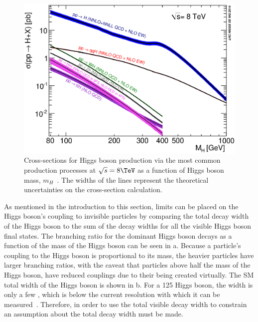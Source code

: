 \begin{figure}
  \includegraphics[width=\largefigwidth]{plots/theory/XS_8TeV.eps}
  \caption{Cross-sections for Higgs boson production via the most common production processes at $\sqrt{s}=8 \TeV$ as a function of Higgs boson mass, $m_{H}$~\cite{Heinemeyer:1559921}. The widths of the lines represent the theoretical uncertainties on the cross-section calculation.}
  \label{fig:smprod}
\end{figure}

As mentioned in the introduction to this section, limits can be placed on the Higgs boson's coupling to invisible particles by comparing the total decay width of the Higgs boson to the sum of the decay widths for all the visible Higgs boson final states. The branching ratio for the dominant Higgs boson decays as a function of the mass of the Higgs boson can be seen in a. Because a particle's coupling to the Higgs boson is proportional to its mass, the heavier particles have larger branching ratios, with the caveat that particles above half the mass of the Higgs boson, have reduced couplings due to their being created virtually. The \ac{SM} total width of the Higgs boson is shown in b. For a 125 \GeV Higgs boson, the width is only a few \MeV, which is below the current resolution with which it can be measured~\cite{Khachatryan201464}.
Therefore, in order to use the total visible decay width to constrain \BRinv an assumption about the total decay width must be made. 

